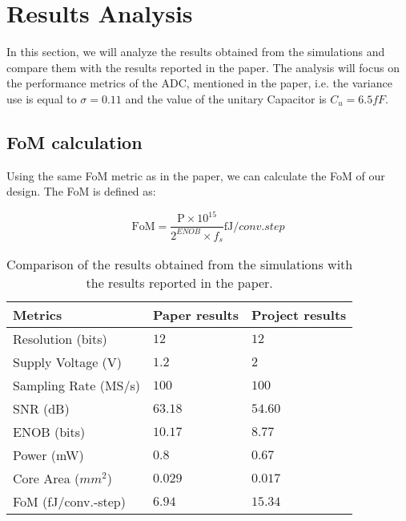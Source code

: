 \section{Results Analysis}
\label{sec:results}

In this section, we will analyze the results obtained from the simulations and compare them with the results reported in the paper. The analysis will focus on the performance metrics of the ADC, mentioned in the paper, i.e. the variance use is equal to $\sigma = 0.11$ and the value of the unitary Capacitor is $C_u = 6.5fF$.

\subsection{FoM calculation}

Using the same FoM metric as in the paper, we can calculate the FoM of our design. The FoM is defined as:

\begin{equation}
    \text{FoM} = \frac{\text{P} \times 10^{15}}{2^{ENOB} \times f_s } \si{\femto \joule \per conv.step}
    \label{eq:FoM}
\end{equation}

\begin{table}[h]
    \centering
    \caption{Comparison of the results obtained from the simulations with the results reported in the paper.}
    \begin{tabularx}{\textwidth}{>{\centering\arraybackslash}X >{\centering\arraybackslash}X >{\centering\arraybackslash}X }
        \toprule
        \textbf{Metrics} & \textbf{Paper results} & \textbf{Project results}\\
        \midrule
        Resolution (bits) & $12$ & $12$ \\
        \midrule
        Supply Voltage (V) & $1.2$ & $2$ \\
        \midrule
        Sampling Rate (MS/s) & $100$ & $100$  \\
        \midrule
        SNR (dB) & $63.18$ & $54.60$ \\
        \midrule
        ENOB (bits) & $10.17$ & $8.77$ \\
        \midrule
        Power (mW) & $0.8$ & $0.67$   \\
        \midrule
        Core Area ($mm^2$) & $0.029$ & $0.017$   \\
        \midrule
        FoM (fJ/conv.-step) & $6.94$ & $15.34$  \\
        \bottomrule
    \end{tabularx}
    \label{tab:comparison_results}
\end{table}

